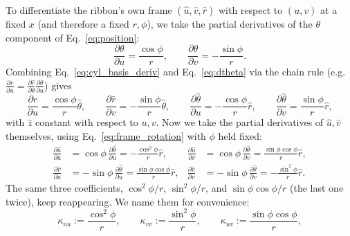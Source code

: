 \documentclass[11pt]{article}
\begin{document}
To differentiate the ribbon's own frame $(\hat u,\hat v,\hat r)$ with respect to $(u,v)$ at a fixed $x$ (and therefore a fixed $r,\phi$), we take the partial derivatives of the $\theta$ component of Eq.~\eqref{eq:position}:
\begin{equation}\label{eq:dtheta}
    \frac{\partial\theta}{\partial u} = \frac{\cos\phi}{r}, \qquad \frac{\partial\theta}{\partial v} = -\frac{\sin\phi}{r}.
\end{equation}
Combining Eq.~\eqref{eq:cyl_basis_deriv} and Eq.~\eqref{eq:dtheta} via the chain rule (e.g.\ $\frac{\partial\hat r}{\partial u} = \frac{\partial\hat r}{\partial\theta}\frac{\partial\theta}{\partial u}$) gives
\begin{equation}\label{eq:cyl_basis_uv}
    \frac{\partial\hat r}{\partial u} = \frac{\cos\phi}{r}\hat\theta, \qquad
    \frac{\partial\hat r}{\partial v} = -\frac{\sin\phi}{r}\hat\theta, \qquad
    \frac{\partial\hat\theta}{\partial u} = -\frac{\cos\phi}{r}\hat r, \qquad
    \frac{\partial\hat\theta}{\partial v} = \frac{\sin\phi}{r}\hat r,
\end{equation}
with $\hat z$ constant with respect to $u,v$. Now we take the partial derivatives of $\hat u,\hat v$ themselves, using Eq.~\eqref{eq:frame_rotation} with $\phi$ held fixed:
\begin{equation}\label{eq:duv_raw}
    \begin{aligned}
    \frac{\partial\hat u}{\partial u} &= \cos\phi\,\frac{\partial\hat\theta}{\partial u} = -\frac{\cos^2\phi}{r}\hat r, &
    \frac{\partial\hat u}{\partial v} &= \cos\phi\,\frac{\partial\hat\theta}{\partial v} = \frac{\sin\phi\cos\phi}{r}\hat r, \\
    \frac{\partial\hat v}{\partial u} &= -\sin\phi\,\frac{\partial\hat\theta}{\partial u} = \frac{\sin\phi\cos\phi}{r}\hat r, &
    \frac{\partial\hat v}{\partial v} &= -\sin\phi\,\frac{\partial\hat\theta}{\partial v} = -\frac{\sin^2\phi}{r}\hat r.
    \end{aligned}
\end{equation}
The same three coefficients, $\cos^2\phi/r$, $\sin^2\phi/r$, and $\sin\phi\cos\phi/r$ (the last one twice), keep reappearing. We name them for convenience:
\begin{equation}\label{eq:curvatures}
    \kappa_{uu} := \frac{\cos^2\phi}{r}, \qquad
    \kappa_{vv} := \frac{\sin^2\phi}{r}, \qquad
    \kappa_{uv} := \frac{\sin\phi\cos\phi}{r},
\end{equation}
\end{document}
